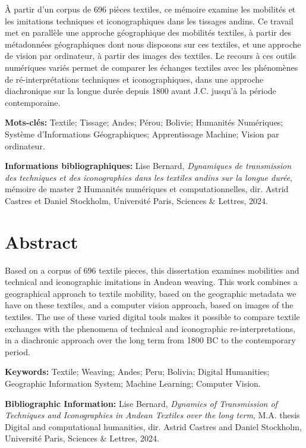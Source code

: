 \documentclass[a4paper, twoside]{book}
\begin{document}
À partir d'un corpus de 696 pièces textiles, ce mémoire examine les mobilités et les imitations techniques et iconographiques dans les tissages andins. Ce travail met en parallèle une approche géographique des mobilités textiles, à partir des métadonnées géographiques dont nous disposons sur ces textiles, et une approche de vision par ordinateur, à partir des images des textiles. Le recours à ces outils numériques variés permet de comparer les échanges textiles avec les phénomènes de ré-interprétations techniques et iconographiques, dans une approche diachronique sur la longue durée depuis 1800 avant J.C. jusqu’à la période contemporaine.

\medskip

\textbf{Mots-clés:} Textile; Tissage; Andes; Pérou; Bolivie; Humanités Numériques; Système d'Informations Géographiques; Apprentissage Machine; Vision par ordinateur.

\textbf{Informations bibliographiques:} Lise Bernard, \textit{Dynamiques de transmission des techniques et des iconographies dans les textiles andins sur la longue durée}, mémoire de master 2 \og Humanités numériques et computationnelles\fg{}, dir. Astrid Castres et Daniel Stockholm, Université Paris, Sciences \& Lettres, 2024.

\vspace{5pt}

\section*{Abstract}

Based on a corpus of 696 textile pieces, this dissertation examines mobilities and technical and iconographic imitations in Andean weaving. This work combines a geographical approach to textile mobility, based on the geographic metadata we have on these textiles, and a computer vision approach, based on images of the textiles. The use of these varied digital tools makes it possible to compare textile exchanges with the phenomena of technical and iconographic re-interpretations, in a diachronic approach over the long term from 1800 BC to the contemporary period.

\medskip

\textbf{Keywords:} Textile; Weaving; Andes; Peru; Bolivia; Digital Humanities; Geographic Information System; Machine Learning; Computer Vision.

\textbf{Bibliographic Information:} Lise Bernard, \textit{Dynamics of Transmission of Techniques and Iconographies in Andean Textiles over the long term}, M.A. thesis \og Digital and computational humanities\fg{}, dir. Astrid Castres and Daniel Stockholm, Université Paris, Sciences \& Lettres, 2024.
\end{document}
